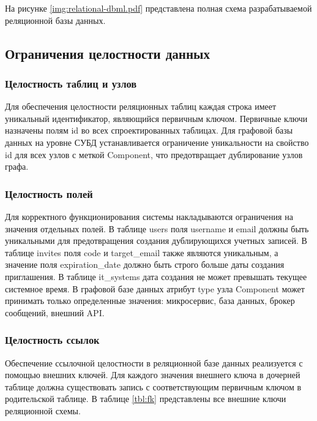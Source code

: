 На рисунке \ref{img:relational-dbml.pdf} представлена полная схема разрабатываемой реляционной базы данных.


\clearpage

\subsection{Ограничения целостности данных}

\subsubsection{Целостность таблиц и узлов}
Для обеспечения целостности реляционных таблиц каждая строка имеет уникальный
идентификатор, являющийся первичным ключом. Первичные ключи назначены полям id во всех
спроектированных таблицах. Для графовой базы данных на уровне СУБД устанавливается
ограничение уникальности на свойство id для всех узлов с меткой Component, что
предотвращает дублирование узлов графа.

\subsubsection{Целостность полей}
Для корректного функционирования системы накладываются ограничения на значения отдельных
полей. В таблице users поля username и email должны быть уникальными для
предотвращения создания дублирующихся учетных записей. В таблице invites поля code и 
target\_email также являются уникальным, а значение поля expiration\_date должно быть 
строго больше даты создания приглашения. В таблице it\_systems дата создания не может превышать текущее
системное время. В графовой базе данных атрибут type узла Component может принимать
только определенные значения: микросервис, база данных, брокер сообщений, внешний API.

\subsubsection{Целостность ссылок}
Обеспечение ссылочной целостности в реляционной базе данных реализуется с помощью внешних
ключей. Для каждого значения внешнего ключа в дочерней таблице должна существовать запись
с соответствующим первичным ключом в родительской таблице. В таблице \ref{tbl:fk}
представлены все внешние ключи реляционной схемы.

